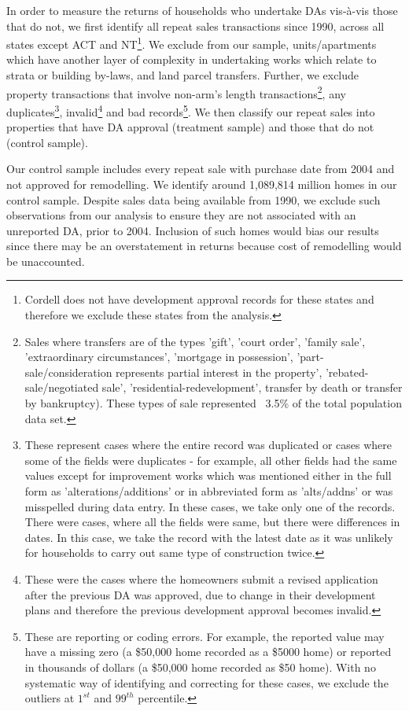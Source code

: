 \documentclass[AEJ,reqno, draftmode]{AEA} %
\begin{document}
In order to measure the returns of households who undertake DAs vis-à-vis those that do not, we first identify all repeat sales transactions since 1990, across all states except ACT and NT\footnote{Cordell does not have development approval records for these states and therefore we exclude these states from the analysis.}. We exclude from our sample, units/apartments which have another layer of complexity in undertaking works which relate to strata or building by-laws, and land parcel transfers. Further, we exclude property transactions that involve non-arm's length transactions\footnote{Sales where transfers are of the types 'gift', 'court order', 'family sale', 'extraordinary circumstances', 'mortgage in possession', 'part-sale/consideration represents partial interest in the property', 'rebated-sale/negotiated sale', 'residential-redevelopment', transfer by death or transfer by bankruptcy). These types of sale represented ~3.5\% of the total population data set.}, any duplicates\footnote{These represent cases where the entire record was duplicated or cases where some of the fields were duplicates - for example, all other fields had the same values except for improvement works which was mentioned either in the full form as 'alterations/additions' or in abbreviated form  as 'alts/addns' or was misspelled during data entry. In these cases, we take only one of the records. There were cases, where all the fields were same, but there were differences in dates. In this case, we take the record with the latest date as it was unlikely for households to carry out same type of construction twice.}, invalid\footnote{These were the cases where the homeowners submit a revised application after the previous DA was approved, due to change in their development plans and therefore the previous development approval becomes invalid.} and bad records\footnote{These are reporting or coding errors. For example, the reported value may have a missing zero (a \$50,000 home recorded as a \$5000 home) or reported in thousands of dollars (a \$50,000 home recorded as \$50 home). With no systematic way of identifying and correcting for these cases, we exclude the outliers at $1^{st}$ and $99^{th}$ percentile.}. We then classify our repeat sales into properties that have DA approval (treatment sample) and those that do not (control sample). 

Our control sample includes every repeat sale with purchase date from 2004 and not approved for remodelling. We identify around 1,089,814 million homes in our control sample. Despite sales data being available from 1990, we exclude such observations from our analysis to ensure they are not associated with an unreported DA, prior to 2004. Inclusion of such homes would bias our results since there may be an overstatement in returns because cost of remodelling would be unaccounted.
\end{document}
